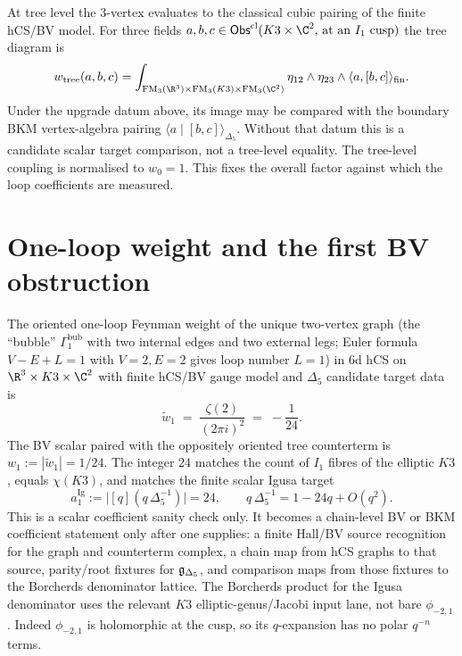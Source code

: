 At tree level the 3-vertex evaluates to the classical cubic pairing of
the finite hCS/BV model. For three fields
$a,b,c\in \Obs^{\mathrm{cl}}(K3\times\C^2\text{, at an }I_1\text{ cusp})$
the tree diagram is
\[
w_{\mathrm{tree}}(a,b,c)
= \int_{\FM_3(\R^3)\times\FM_3(K3)\times\FM_3(\C^2)}
\eta_{12}\wedge\eta_{23}\wedge
\langle a,[b,c]\rangle_{\mathrm{fin}}.
\]
Under the upgrade datum above, its image may be compared with the
boundary BKM vertex-algebra pairing
$\langle a\mid[b,c]\rangle_{\Delta_5}$. Without that datum this is a
candidate scalar target comparison, not a tree-level equality.
The tree-level coupling is normalised to $w_0 = 1$. This fixes the
overall factor against which the loop coefficients are measured.

\section{One-loop weight and the first BV obstruction}
\label{sec:6d-hcs-one-loop}

\begin{theorem}
\label{thm:6d-hcs-one-loop-coefficient}
The oriented one-loop Feynman weight of the unique two-vertex graph
(the ``bubble'' $\Gamma_1^{\mathrm{bub}}$ with two internal edges and
two external legs; Euler formula $V-E+L=1$ with $V=2, E=2$ gives loop
number $L = 1$) in 6d hCS on $\R^3\times K3\times\C^2$ with finite
hCS/BV gauge model and $\Delta_5$ candidate target data is
\begin{equation}
\label{eq:one-loop-weight-main}
\widetilde w_1 \;=\; \frac{\zeta(2)}{(2\pi i)^2} \;=\; -\frac{1}{24}.
\end{equation}
The BV scalar paired with the oppositely oriented tree counterterm is
$w_1:=|\widetilde w_1|=1/24$.
The integer $24$ matches the count of $I_1$ fibres of the elliptic
$K3$, equals $\chi(K3)$, and matches the finite scalar Igusa target
\[
 a_1^{\mathrm{Ig}} :=
 \bigl|[q](q\,\Delta_5^{-1})\bigr|=24,
 \qquad q\,\Delta_5^{-1}=1-24q+O(q^2).
\]
This is a scalar coefficient sanity check only. It becomes a
chain-level BV or BKM coefficient statement only after one supplies:
a finite Hall/BV source recognition for the graph and counterterm
complex, a chain map from hCS graphs to that source, parity/root
fixtures for $\mathfrak{g}_{\Delta_5}$, and comparison maps from those
fixtures to the Borcherds denominator lattice.
The Borcherds product for the Igusa denominator uses the relevant
$K3$ elliptic-genus/Jacobi input lane, not bare $\phi_{-2,1}$.
Indeed $\phi_{-2,1}$ is holomorphic at the cusp, so its $q$-expansion
has no polar $q^{-n}$ terms.
\end{theorem}

